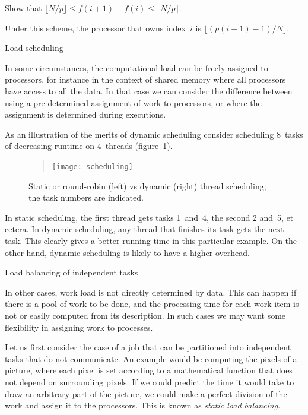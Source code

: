 \begin{exercise}
Show that $\lfloor N/p\rfloor \leq f(i+1)-f(i)\leq \lceil N/p\rceil$.
\end{exercise}

Under this scheme, the processor that owns index~$i$ is
$\lfloor (p(i+1)-1)/N \rfloor$.

 {Load scheduling}
\label{sec:load-schedule}

In some circumstances, the computational load can be freely assigned
to processors, for instance in the context of shared memory where all
processors have access to all the data. In that case we can consider
the difference between  using a
pre-determined assignment of work to processors, or
 where the assignment is determined
during executions.

As an illustration of the merits of dynamic scheduling consider
scheduling 8~tasks of decreasing runtime on 4~threads
(figure~\ref{fig:staticdynamic}).
%
\begin{figure}[ht]
  \begin{quote}
  \texttt{[image: scheduling]}
  \end{quote}
  \caption{Static or round-robin (left) vs dynamic (right) thread
    scheduling; the task numbers are indicated.}
  \label{fig:staticdynamic}
\end{figure}
%
In static scheduling, the first thread gets
tasks 1~and~4, the second 2 and~5, et cetera. In dynamic scheduling,
any thread that finishes its task gets the next task. This clearly
gives a better running time in this particular example. On the other
hand, dynamic scheduling is likely to have a higher overhead.

 {Load balancing of independent tasks}

In other cases, work load is not directly determined by data.
This can happen if there is a pool of work to be done,
and the processing time for each work item is not 
or easily computed from its description. In such cases
we may want some flexibility in assigning work to processes.

Let us first consider the case of a job that can be partitioned into
independent tasks that do not communicate. An example would be
computing the pixels of a  picture, where
each pixel is set according to a mathematical function that does not
depend on surrounding pixels. If we could predict the time it would
take to draw an arbitrary part of the picture, we could make a perfect
division of the work and assign it to the processors. This is known as
\emph{static load balancing}.

